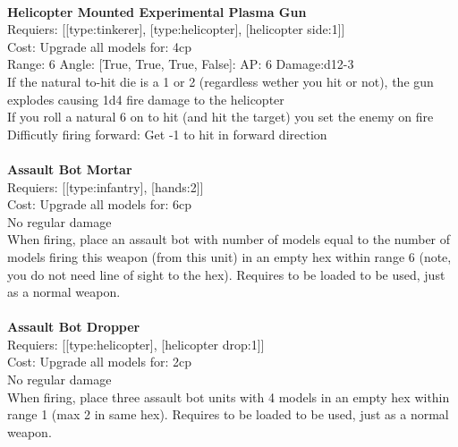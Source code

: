 \ \\
{\bf Helicopter Mounted Experimental Plasma Gun } \\

Requiers: [[type:tinkerer], [type:helicopter], [helicopter side:1]] \\
Cost: Upgrade all models for: 4cp \\


Range: 6  Angle: [True, True, True, False]: AP: 6 Damage:d12-3 \\
If the natural to-hit die is a 1 or 2 (regardless wether you hit or not), the gun explodes causing 1d4 fire damage to the helicopter\\ 
If you roll a natural 6 on to hit (and hit the target) you set the enemy on fire\\ 
Difficutly firing forward: Get -1 to hit in forward direction\\ 








\ \\
{\bf Assault Bot Mortar } \\

Requiers: [[type:infantry], [hands:2]] \\
Cost: Upgrade all models for: 6cp \\
No regular damage\\ 
When firing, place an assault bot with number of models equal to the number of models firing this weapon (from this unit) in an empty hex within range 6 (note, you do not need line of sight to the hex). Requires to be loaded to be used, just as a normal weapon.\\ 









\ \\
{\bf Assault Bot Dropper } \\

Requiers: [[type:helicopter], [helicopter drop:1]] \\
Cost: Upgrade all models for: 2cp \\
No regular damage\\ 
When firing, place three assault bot units with 4 models in an empty hex within range 1 (max 2 in same hex). Requires to be loaded to be used, just as a normal weapon.\\ 









